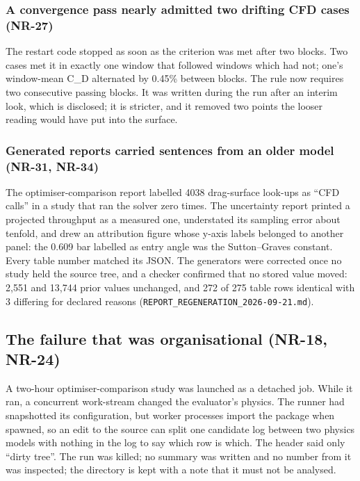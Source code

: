 \documentclass[
  a4paper,
  11pt]{article}
\begin{document}
\subsubsection{A convergence pass nearly admitted two drifting CFD cases
(NR-27)}\label{a-convergence-pass-nearly-admitted-two-drifting-cfd-cases-nr-27}

The restart code stopped as soon as the criterion was met after two
blocks. Two cases met it in exactly one window that followed windows
which had not; one's window-mean C\_D alternated by 0.45\% between
blocks. The rule now requires two consecutive passing blocks. It was
written during the run after an interim look, which is disclosed; it is
stricter, and it removed two points the looser reading would have put
into the surface.

\subsubsection{Generated reports carried sentences from an older model
(NR-31,
NR-34)}\label{generated-reports-carried-sentences-from-an-older-model-nr-31-nr-34}

The optimiser-comparison report labelled 4038 drag-surface look-ups as
``CFD calls'' in a study that ran the solver zero times. The uncertainty
report printed a projected throughput as a measured one, understated its
sampling error about tenfold, and drew an attribution figure whose
y-axis labels belonged to another panel: the 0.609 bar labelled as entry
angle was the Sutton--Graves constant. Every table number matched its
JSON. The generators were corrected once no study held the source tree,
and a checker confirmed that no stored value moved: 2,551 and 13,744
prior values unchanged, and 272 of 275 table rows identical with 3
differing for declared reasons
(\texttt{REPORT\_\allowbreak{}REGENERATION\_\allowbreak{}2026-\allowbreak{}09-\allowbreak{}21.md}).

\subsection{The failure that was organisational (NR-18, NR-24)}

A two-hour optimiser-comparison study was launched as a detached job.
While it ran, a concurrent work-stream changed the evaluator's physics.
The runner had snapshotted its configuration, but worker processes
import the package when spawned, so an edit to the source can split one
candidate log between two physics models with nothing in the log to say
which row is which. The header said only ``dirty tree''. The run was
killed; no summary was written and no number from it was inspected; the
directory is kept with a note that it must not be analysed.
\end{document}
